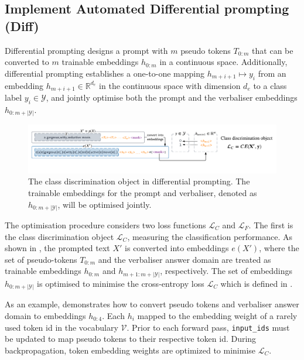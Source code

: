\vspace{-1.0em}
\subsection{Implement Automated Differential prompting (Diff)} \label{sec:diff-prompt}
Differential prompting designs a prompt with $m$ pseudo tokens $T_{0:m}$ that can be converted to $m$ trainable embeddings $h_{0:m}$ in a continuous space. Additionally, differential prompting establishes a one-to-one mapping $h_{m+i+1} \mapsto y_i$ from an embedding $h_{m+i+1} \in \mathbb{R}^{d_e}$ in the continuous space with dimension $d_e$ to a class label $y_i \in \mathcal{Y}$, and jointly optimise both the prompt and the verbaliser embeddings $h_{0:m+|\mathcal{Y}|}$.

\begin{figure}[!ht]
    \centering
    \includegraphics[width=\hsize]{figures/implementation_media/impl-diff-lc.pdf}
    \caption{The class discrimination object in differential prompting. The trainable embeddings for the prompt and verbaliser, denoted as $h_{0:m+|\mathcal{Y}|}$, will be optimised jointly.}
    \label{fig:impl-diff-1}
\end{figure}

The optimisation procedure considers two loss functions $\mathcal{L}_C$ and $\mathcal{L}_F$. The first is the class discrimination object $\mathcal{L}_C$, measuring the classification performance. As shown in , the prompted text $X'$ is converted into embeddings $e(X')$, where the set of pseudo-tokens $T_{0:m}$ and the verbaliser answer domain are treated as trainable embeddings $h_{0:m}$ and $h_{m+1:m+|\mathcal{Y}|}$, respectively. The set of embeddings $h_{0:m+|\mathcal{Y}|}$ is optimised to minimise the cross-entropy loss $\mathcal{L}_C$ which is defined in . 

As an example,  demonstrates how to convert pseudo tokens and verbaliser answer domain to embeddings $h_{0:4}$. Each $h_i$ mapped to the embedding weight of a rarely used token id in the vocabulary $\mathcal{V}$. Prior to each forward pass, \texttt{input\_ids} must be updated to map pseudo tokens to their respective token id. During backpropagation, token embedding weights are optimized to minimise $\mathcal{L}_C$.

